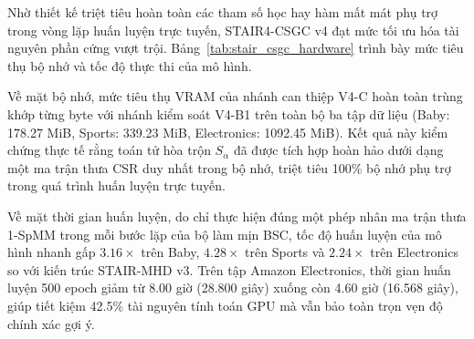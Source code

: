 Nhờ thiết kế triệt tiêu hoàn toàn các tham số học hay hàm mất mát phụ trợ trong vòng lặp huấn luyện trực tuyến, STAIR4-CSGC v4 đạt mức tối ưu hóa tài nguyên phần cứng vượt trội. Bảng~\ref{tab:stair_csgc_hardware} trình bày mức tiêu thụ bộ nhớ và tốc độ thực thi của mô hình.

\begin{table}[H]
\centering
\small
\setlength{\tabcolsep}{4.5pt}
\renewcommand{\arraystretch}{1.2}
\caption{Mức tiêu thụ VRAM tensor đỉnh và tốc độ thực thi của STAIR4-CSGC v4 trên GPU Tesla T4.}
\label{tab:stair_csgc_hardware}
\end{table}

Về mặt bộ nhớ, mức tiêu thụ VRAM của nhánh can thiệp V4-C hoàn toàn trùng khớp từng byte với nhánh kiểm soát V4-B1 trên toàn bộ ba tập dữ liệu (Baby: 178.27 MiB, Sports: 339.23 MiB, Electronics: 1092.45 MiB). Kết quả này kiểm chứng thực tế rằng toán tử hòa trộn $S_\alpha$ đã được tích hợp hoàn hảo dưới dạng một ma trận thưa CSR duy nhất trong bộ nhớ, triệt tiêu 100\% bộ nhớ phụ trợ trong quá trình huấn luyện trực tuyến.

Về mặt thời gian huấn luyện, do chỉ thực hiện đúng một phép nhân ma trận thưa 1-SpMM trong mỗi bước lặp của bộ làm mịn BSC, tốc độ huấn luyện của mô hình nhanh gấp $3.16\times$ trên Baby, $4.28\times$ trên Sports và $2.24\times$ trên Electronics so với kiến trúc STAIR-MHD v3. Trên tập Amazon Electronics, thời gian huấn luyện 500 epoch giảm từ 8.00 giờ (28.800 giây) xuống còn 4.60 giờ (16.568 giây), giúp tiết kiệm 42.5\% tài nguyên tính toán GPU mà vẫn bảo toàn trọn vẹn độ chính xác gợi ý.

\clearpage